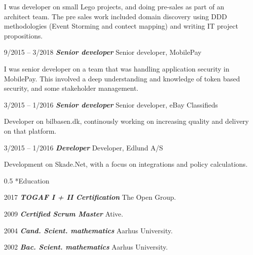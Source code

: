 \documentclass[10pt,a4,sans]{article}
\makeatletter
\renewcommand{\section}{\@startsection{section}{12}
{0mm} 
{0.8\baselineskip} %
{0.5\baselineskip} %
{\Large\scshape
\vspace{0.5\baselineskip}
}}
\makeatother
\begin{document}
\begin{CV}
I was developer on small Lego projects, and doing pre-sales as part of an architect team. The pre sales work included domain discovery using DDD methodologies (Event Storming and contect mapping) and writing IT project propositions.
 
    \item[9/2015 -- 3/2018] \textbf{\emph{Senior developer}} Senior developer, MobilePay 

I was senior developer on a team that was handling application security in MobilePay. This involved a deep understanding and knowledge of token based security, and some stakeholder management.

    \item[3/2015 -- 1/2016] \textbf{\emph{Senior developer}} Senior developer, eBay Classifieds 
    
    Developer on bilbasen.dk, continously working on increasing quality and delivery on that platform.

    \item[3/2015 -- 1/2016] \textbf{\emph{Developer}} Developer, Edlund A/S 
    
    Development on Skade.Net, with a focus on integrations and policy calculations.
    
\end{CV}

\section*{Education}

\begin{CV}
    \item[2017] \textbf{\emph{TOGAF I + II Certification}} The Open Group.
    \item[2009] \textbf{\emph{Certified Scrum Master}} Ative.
    \item[2004] \textbf{\emph{Cand. Scient. mathematics}} Aarhus University.
    \item[2002] \textbf{\emph{Bac. Scient. mathematics}} Aarhus University.
\end{CV}
\end{document}
